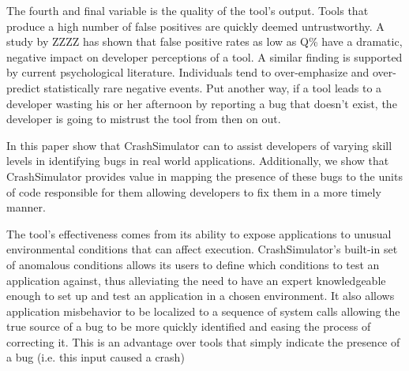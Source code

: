 
The fourth and final variable is the quality of the tool's output.  Tools
that produce a high number of false positives are quickly deemed
untrustworthy.  A study by ZZZZ has shown that false positive rates as low
as Q\% have a dramatic, negative impact on developer perceptions of a tool.
  A similar finding is supported by current psychological
literature.  Individuals tend to over-emphasize and over-predict
statistically rare negative events.  Put another way, if a
tool leads to a developer wasting his or her afternoon by reporting a bug
that doesn't exist, the developer is going to mistrust the tool from then
on out.

% 

In this paper show that CrashSimulator can to assist
developers of varying skill levels in identifying bugs in real world
applications.  Additionally, we show that CrashSimulator provides value in
mapping the presence of these bugs to the units of code responsible for
them allowing developers to fix them in a more timely manner.

The tool's effectiveness comes from its ability to expose applications to
unusual environmental conditions that can affect
execution.  CrashSimulator's built-in set of anomalous
conditions allows its users to define which conditions to test an
application against, thus alleviating the need to have an expert
knowledgeable enough
to set up and test an application in a chosen environment.
It also allows application misbehavior to be localized to a
sequence of system calls allowing the true source of a bug to be more
quickly identified and easing the process of correcting it.  This is an
advantage over tools that simply indicate the presence of a bug (i.e.  this
input caused a crash)

